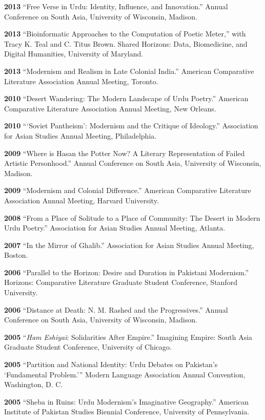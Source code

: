 \documentclass[letterpaper,12pt]{article}
\begin{document}
\textbf{2013}
“Free Verse in Urdu: Identity, Influence, and Innovation.”
Annual Conference on South Asia, University of Wisconsin, Madison.

\textbf{2013}
“Bioinformatic Approaches to the Computation of Poetic Meter,”
with Tracy K. Teal and C. Titus Brown.
Shared Horizons: Data, Biomedicine, and Digital Humanities, University of Maryland.

\textbf{2013}
“Modernism and Realism in Late Colonial India.”
American Comparative Literature Association Annual Meeting, Toronto.

\textbf{2010}
“Desert Wandering: The Modern Landscape of Urdu Poetry.”
American Comparative Literature Association Annual Meeting, New Orleans.

\textbf{2010}
“‘Soviet Pantheism’: Modernism and the Critique of Ideology.”
Association for Asian Studies Annual Meeting, Philadelphia.

\textbf{2009}
“Where is Hasan the Potter Now? A Literary Representation of Failed Artistic Personhood.”
Annual Conference on South Asia, University of Wisconsin, Madison.

\textbf{2009}
“Modernism and Colonial Difference.”
American Comparative Literature Association Annual Meeting, Harvard University.

\textbf{2008}
“From a Place of Solitude to a Place of Community: The Desert in Modern Urdu Poetry.”
Association for Asian Studies Annual Meeting, Atlanta.

\textbf{2007}
“In the Mirror of Ghalib.”
Association for Asian Studies Annual Meeting, Boston.

\textbf{2006}
“Parallel to the Horizon: Desire and Duration in Pakistani Modernism.”
Horizons: Comparative Literature Graduate Student Conference, Stanford University.

\textbf{2006}
“Distance at Death: N. M. Rashed and the Progressives.”
Annual Conference on South Asia, University of Wisconsin, Madison.

\textbf{2005}
“\emph{Ham Eshiyai}: Solidarities After Empire.”
Imagining Empire: South Asia Graduate Student Conference, University of Chicago.

\textbf{2005}
“Partition and National Identity: Urdu Debates on Pakistan’s ‘Fundamental Problem.’”
Modern Language Association Annual Convention, Washington, D. C.

\textbf{2005}
“Sheba in Ruins: Urdu Modernism’s Imaginative Geography.”
American Institute of Pakistan Studies Biennial Conference, University of Pennsylvania.
\end{document}
